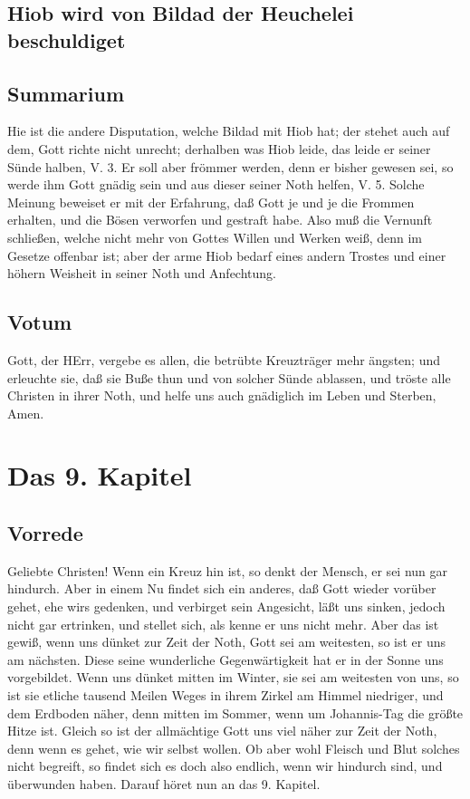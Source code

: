 \section{Hiob wird von Bildad der Heuchelei beschuldiget}

\section{Summarium}

Hie ist die andere Disputation, welche Bildad mit Hiob hat; der stehet auch auf dem, Gott richte nicht unrecht; derhalben was Hiob leide, das leide er seiner Sünde halben, V. 3. Er soll aber frömmer werden, denn er bisher gewesen sei, so werde ihm Gott gnädig sein und aus dieser seiner Noth helfen, V. 5. Solche Meinung beweiset er mit der Erfahrung, daß Gott je und je die Frommen erhalten, und die Bösen verworfen und gestraft habe. Also muß die Vernunft schließen, welche nicht mehr von Gottes Willen und Werken weiß, denn im Gesetze offenbar ist; aber der arme Hiob bedarf eines andern Trostes und einer höhern Weisheit in seiner Noth und Anfechtung.

\section{Votum}

Gott, der HErr, vergebe es allen, die betrübte Kreuzträger mehr ängsten; und erleuchte sie, daß sie Buße thun und von solcher Sünde ablassen, und tröste alle Christen in ihrer Noth, und helfe uns auch gnädiglich im Leben und Sterben, Amen.

\chapter{Das 9. Kapitel}

\section{Vorrede}

Geliebte Christen! Wenn ein Kreuz hin ist, so denkt der Mensch, er sei nun gar hindurch. Aber in einem Nu findet sich ein anderes, daß Gott wieder vorüber gehet, ehe wirs gedenken, und verbirget sein Angesicht, läßt uns sinken, jedoch nicht gar ertrinken, und stellet sich, als kenne er uns nicht mehr. Aber das ist gewiß, wenn uns dünket zur Zeit der Noth, Gott sei am weitesten, so ist er uns am nächsten. Diese seine wunderliche Gegenwärtigkeit hat er in der Sonne uns vorgebildet. Wenn uns dünket mitten im Winter, sie sei am weitesten von uns, so ist sie etliche tausend Meilen Weges in ihrem Zirkel am Himmel niedriger, und dem Erdboden näher, denn mitten im Sommer, wenn um Johannis-Tag die größte Hitze ist. Gleich so ist der allmächtige Gott uns viel näher zur Zeit der Noth, denn wenn es gehet, wie wir selbst wollen. Ob aber wohl Fleisch und Blut solches nicht begreift, so findet sich es doch also endlich, wenn wir hindurch sind, und überwunden haben. Darauf höret nun an das 9. Kapitel.

